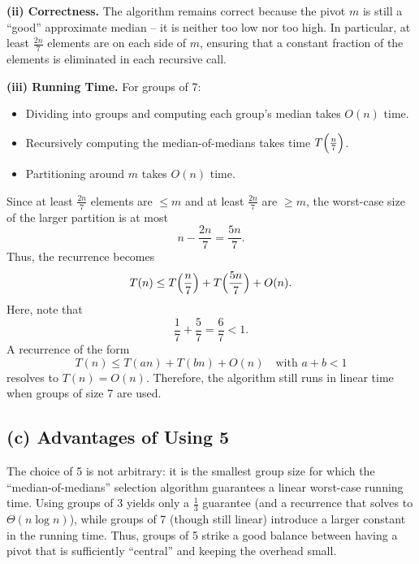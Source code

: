 \documentclass[11pt]{article}
\begin{document}
    \medskip
    
    \textbf{(ii) Correctness.}  
    The algorithm remains correct because the pivot \(m\) is still a “good” approximate median – it is neither too low nor too high. In particular, at least \(\frac{2n}{7}\) elements are on each side of \(m\), ensuring that a constant fraction of the elements is eliminated in each recursive call.
    
    \medskip
    
    \textbf{(iii) Running Time.}  
    For groups of 7:
    \begin{itemize}
        \item Dividing into groups and computing each group’s median takes \(O(n)\) time.
        \item Recursively computing the median-of-medians takes time \(T\Bigl(\frac{n}{7}\Bigr)\).
        \item Partitioning around \(m\) takes \(O(n)\) time.
    \end{itemize}
    Since at least \(\frac{2n}{7}\) elements are \(\le m\) and at least \(\frac{2n}{7}\) are \(\ge m\), the worst-case size of the larger partition is at most
    \[
    n - \frac{2n}{7} = \frac{5n}{7}.
    \]
    Thus, the recurrence becomes
    \[
    T(n) \le T\Bigl(\frac{n}{7}\Bigr) + T\Bigl(\frac{5n}{7}\Bigr) + O(n).
    \]
    Here, note that
    \[
    \frac{1}{7} + \frac{5}{7} = \frac{6}{7} < 1.
    \]
    A recurrence of the form
    \[
    T(n) \le T(an) + T(bn) + O(n) \quad \text{with } a+b < 1
    \]
    resolves to \(T(n) = O(n)\). Therefore, the algorithm still runs in linear time when groups of size 7 are used.
    
    \bigskip
    
    \subsection*{(c) Advantages of Using 5}  
    The choice of 5 is not arbitrary: it is the smallest group size for which the “median-of-medians” selection algorithm guarantees a linear worst-case running time. Using groups of 3 yields only a \(\frac{1}{3}\) guarantee (and a recurrence that solves to \(\Theta(n\log n)\)), while groups of 7 (though still linear) introduce a larger constant in the running time. Thus, groups of 5 strike a good balance between having a pivot that is sufficiently “central” and keeping the overhead small.
    
\end{document}
